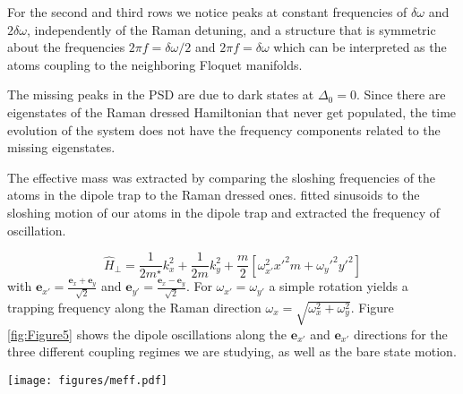 For the second and third rows we notice peaks at constant frequencies of $\delta\omega$ and $2\delta\omega$, independently of the Raman detuning, and a structure that is symmetric about the frequencies $2\pi f=\delta\omega/2$ and $2\pi f=\delta\omega$  which can be interpreted as the atoms coupling to the neighboring Floquet manifolds.  

The missing peaks in the PSD are due to dark states at $\Delta_0=0$. Since there are eigenstates of the Raman dressed Hamiltonian that never get populated, the time evolution of the system does not have the frequency components related to the missing eigenstates. 

The effective mass was extracted by comparing the sloshing frequencies of the atoms in the dipole trap to the Raman dressed ones.  fitted sinusoids to the sloshing motion of our atoms in the dipole trap and extracted the frequency of oscillation. %

\begin{equation}
\hat{H}_{\perp}=\frac{1}{2m^{\star}}k_x^2 + \frac{1}{2m}k_y^2+\frac{m}{2}[\omega_{x'}^2x'^2m+\omega_y'^2y'^2]
\end{equation}
%
with $\mathbf{e}_{x'}=\frac{\mathbf{e}_{x}+\mathbf{e}_{y}}{\sqrt{2}}$ and  $\mathbf{e}_{y'}=\frac{\mathbf{e}_{x}-\mathbf{e}_{y}}{\sqrt{2}}$. For $\omega_{x'}=\omega_{y'}$ a simple rotation yields a trapping frequency along the Raman direction $\omega_x=\sqrt{\omega_x^2+\omega_y^2}$.   
Figure \ref{fig:Figure5} shows the dipole oscillations along the $\mathbf{e}_{x'}$ and $\mathbf{e}_{x'}$ directions for the three different coupling regimes we are studying, as well as the bare state motion. 

\begin{figure*}
	\begin{center}
		\texttt{[image: figures/meff.pdf]}
		\caption
		{  Oscillation of the BEC in the dipole trap along the directions $\mathbf{e}_{x'}$ and  $\mathbf{e}_{y'}$ defiend by the propagation of the dipole tap beams. The traces have been shifted so that it is easier to appreciate the change in the motion for each coupling regime.	
		}
		\label{fig:Figure5}
	\end{center}
\end{figure*}

